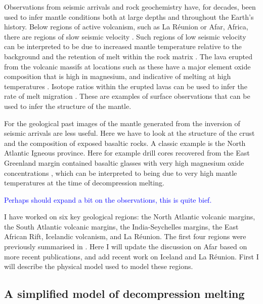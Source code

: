 Observations from seismic arrivals and rock geochemistry have, for decades, been used to infer mantle conditions both at large depths and throughout the Earth's history. Below regions of active volcanism, such as La Réunion or Afar, Africa, there are regions of slow seismic velocity \citep[e.g.][]{mazzullo-etal-2017,bastow-etal-2005}. Such regions of low seismic velocity can be interpreted to be due to increased mantle temperature relative to the background and the retention of melt within the rock matrix \citep[e.g.][]{goes-etal-2012,armitage-etal-epsl-2015}. The lava erupted from the volcanic massifs at locations such as these have a major element oxide composition that is high in magnesium, and indicative of melting at high temperatures \citep[e.g.][]{rooney-etal-2012,herzberg-etal-2007}. Isotope ratios within the erupted lavas can be used to infer the rate of melt migration \citep[e.g.][]{elliot-2014}. These are examples of surface observations that can be used to infer the structure of the mantle.

For the geological past images of the mantle generated from the inversion of seismic arrivals are less useful. Here we have to look at the structure of the crust and the composition of exposed basaltic rocks. A classic example is the North Atlantic Igneous province. Here for example drill cores recovered from the East Greenland margin contained basaltic glasses with very high magnesium oxide concentrations \citep{fitton-etal-1998}, which can be interpreted to being due to very high mantle temperatures at the time of decompression melting.

\textcolor{blue}{Perhaps should expand a bit on the observations, this is quite bief.}

I have worked on six key geological regions: the North Atlantic volcanic margins, the South Atlantic volcanic margins, the India-Seychelles margins, the East African Rift, Icelandic volcanism, and La Réunion. The first four regions were previously summarised in \cite{armitage-2018}. Here I will update the discussion on Afar based on more recent publications, and add recent work on Iceland and La Réunion. First I will describe the physical model used to model these regions.

\subsection{A simplified model of decompression melting}

